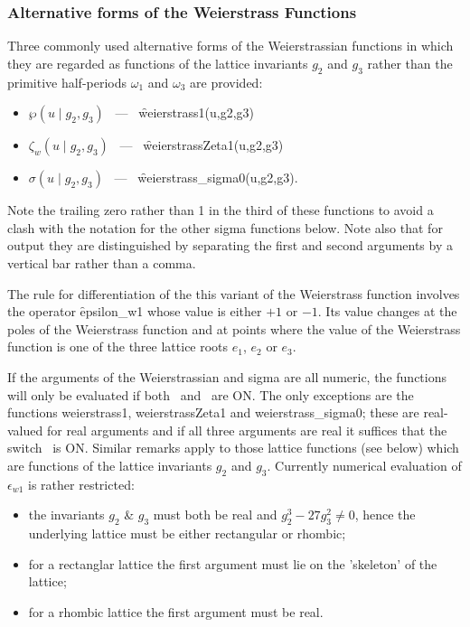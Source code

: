 \subsubsection{Alternative forms of the Weierstrass Functions}
\hypertarget{WEIERSTRASS1}{}
\hypertarget{WEIERSTRASSZETA1}{}
\hypertarget{WEIERSTRASS_SIGMA0}{}
\hypertarget{operator:WEIERSTRASS1}{}
\hypertarget{operator:WEIERSTRASSZETA1}{}
\hypertarget{operator:WEIERSTRASS_SIGMA0}{}
Three commonly used alternative forms of the Weierstrassian functions in which
they are regarded as functions of the lattice invariants $g_2$ and $g_3$
rather than the primitive half-periods $\omega_1$ and $\omega_3$ are provided:
\begin{itemize}
\item  $\wp(u \mid g_2, g_3)$ \ --- \ \f{weierstrass1(u,g2,g3)}
\item $\zeta_w(u \mid g_2, g_3)$ \ --- \ \f{weierstrassZeta1(u,g2,g3)}
\item $\sigma(u \mid g_2, g_3)$ \ --- \ \f{weierstrass\_sigma0(u,g2,g3)}.
\end{itemize}
Note the trailing zero rather than 1 in the third of these functions to avoid a
clash with the notation for the other sigma functions below.
Note also that for output they are distinguished by separating the first and
second arguments by a vertical bar rather than a comma.

The rule for differentiation of the this variant of the Weierstrass function
involves the operator \f{epsilon\_w1} whose value is either $+1$ or $-1$.
Its value changes at the poles of the Weierstrass function and at points where the value of the Weierstrass function is one of the three lattice roots $e_1$, $e_2$ or $e_3$.

If the arguments of the Weierstrassian and sigma are all numeric, the functions
will only be evaluated if both \ and \ are ON.
The only exceptions are the functions weierstrass1, weierstrassZeta1 and
weierstrass\_sigma0; these are real-valued for real arguments and if all three
arguments are real it suffices that the switch \ is ON. Similar
remarks apply to those lattice functions (see below) which are functions of
the lattice invariants $g_2$ and $g_3$.
Currently numerical evaluation of $\epsilon_{w1}$ is rather restricted:
\begin{itemize}
\item  the invariants $g_2$ \& $g_3$ must both be real and $g_2^3-27g_3^2\neq 0$,
hence the underlying lattice must be either rectangular or rhombic;
\item  for a rectanglar lattice the first argument must lie on the 'skeleton'
  of the lattice;
\item for a rhombic lattice the first argument must be real.
\end{itemize}

